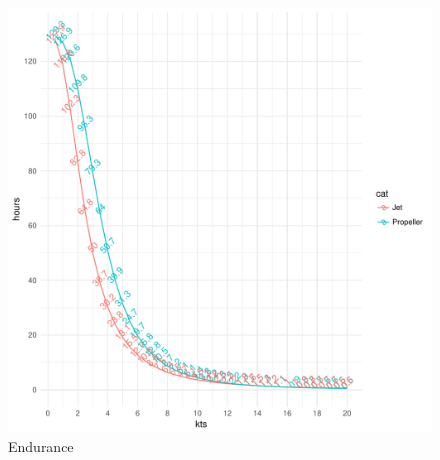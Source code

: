 \documentclass{article}\usepackage[]{graphicx}\usepackage[]{color}
\makeatletter
\def\maxwidth{ %
  \ifdim\Gin@nat@width>\linewidth
    \linewidth
  \else
    \Gin@nat@width
  \fi
}
\newenvironment{knitrout}{}{} %
\makeatother
\begin{document}
\begin{figure}
\begin{knitrout}
\color{fgcolor}

{\centering \includegraphics[width=\maxwidth]{figures/plots-plot_end-1} 

}



\end{knitrout}
\caption{Endurance}
\label{fig:Endurance_plot}
\end{figure}
\end{document}
